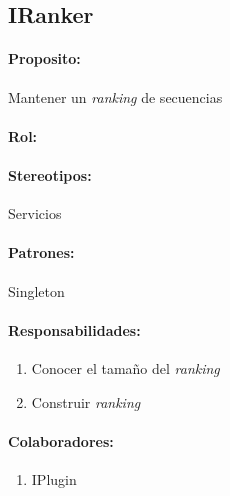 \documentclass[a4paper,10pt]{article}
\begin{document}
  \subsection{IRanker}
    \paragraph{Proposito:} Mantener un \textit{ranking} de secuencias
    \paragraph{Rol:}
    \paragraph{Stereotipos:} Servicios
    \paragraph{Patrones:} Singleton
    \paragraph{Responsabilidades:}
      \begin{enumerate}
       \item Conocer el tama\~no del \textit{ranking}       
       \item Construir \textit{ranking}
      \end{enumerate}
    \paragraph{Colaboradores:}
      \begin{enumerate}
       \item IPlugin
      \end{enumerate}

\begin{comment}
  \subsection{Clase}
    \paragraph{Proposito:}
    \paragraph{Rol:}
    \paragraph{Stereotipos:}
    \paragraph{Patrones:}
    \paragraph{Responsabilidades:}
      \begin{enumerate}
       \item 
      \end{enumerate}
    \paragraph{Colaboradores:}
\end{comment}
\end{document}

